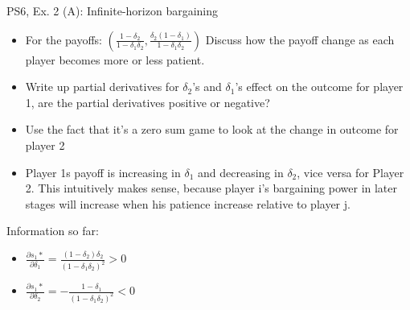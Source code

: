 \begin{frame}{PS6, Ex. 2 (A): Infinite-horizon bargaining}
    \begin{itemize}
    \item[Part one:] For the payoffs: $ \left( \frac{1-\delta_2}{1-\delta_1\delta_2},\frac{\delta_2(1-\delta_1)}{1-\delta_1\delta_2}\right)$ Discuss how the payoff change as each player becomes more or less patient.
    \end{itemize}
    \vfill\null
  \begin{multicols}{2}
    \begin{itemize}
      \item[(Step a)] Write up partial derivatives for $\delta_2$'s and $\delta_1$'s effect on the outcome for player 1, are the partial derivatives positive or negative?
      \item[(Step b)] Use the fact that it's a zero sum game to look at the change in outcome for player 2
      \item[Answer] Player 1s payoff is increasing in $\delta_1$ and decreasing in $\delta_2$, vice versa for Player 2. This intuitively makes sense, because player i's bargaining power in later stages will increase when his patience increase relative to player j.
      \end{itemize}
    \vfill\null \columnbreak
    Information so far:
    \begin{itemize}
    \item[1] $\frac{\partial s_1*}{\partial \delta_1} = \frac{(1-\delta_2)\delta_2}{(1-\delta_1\delta_2)^2}>0 $\\
    \item[2] $\frac{\partial s_1*}{\partial \delta_2} = -\frac{1-\delta_1}{(1-\delta_1\delta_2)^2}<0 $\\
    \end{itemize}
    \vfill\null
  \end{multicols}
\vfill\null
\end{frame}


